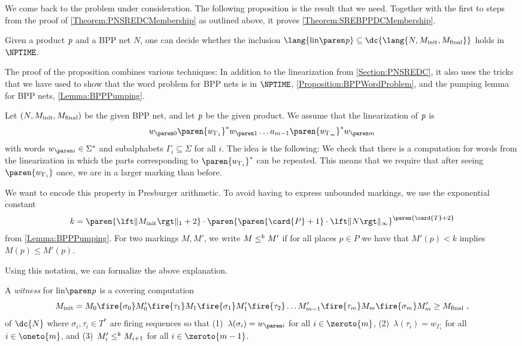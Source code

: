 \documentclass[../../diss.tex]{subfiles}
\begin{document}
We come back to the problem under consideration.
The following proposition is the result that we need.
Together with the first to steps from the proof of \cref{Theorem:PNSREDCMembership} as outlined above, it proves \cref{Theorem:SREBPPDCMembership}.

\begin{proposition}%
\label{Proposition:BPPLinearizationInclusion}%
    Given a product $\mathit{p}$ and a BPP net $N$, one can decide whether the inclusion
    $\lang{\linof{\product}} \subseteq \dc{\lang{N,\Minit,\Mfinal}}$
    holds in $\NPTIME$.
\end{proposition}

The proof of the proposition combines various techniques:
In addition to the linearization from \cref{Section:PNSREDC}, it also uses the tricks that we have used to show that the word problem for BPP nets is in $\NPTIME$, \cref{Proposition:BPPWordProblem}, and the pumping lemma for BPP nets, \cref{Lemma:BPPPumping}.

%
\cheatpagebreak
%

Let $(N,M_{\text{init}},M_{\text{final}})$ be the given BPP net, and let $\mathit{p}$ be the given product.
We assume that the linearization of $\mathit{p}$ is
\[
    \dtr{w}{0} \paren{w_{\Gamma_1}}^* \dtr{w}{1} \ldots a_{m-1} \paren{w_{\Gamma_m}}^* \dtr{w}{m}
\]
with words $\dtr{w}{i} \in \Sigma^*$ and subalphabets $\Gamma_i \subseteq \Sigma$ for all $i$.
The idea is the following:
We check that there is a computation for words from the linearization in which the parts corresponding to $\paren{w_{\Gamma_i}}^*$ can be repeated.
This means that we require that after seeing $\paren{w_{\Gamma_i}}$ once, we are in a larger marking than before.

We want to encode this property in Presburger arithmetic.
To avoid having to express unbounded markings, we use the exponential constant
\[
    k = \paren{\normone{\Minit}+2} \cdot \paren{ \paren{\card{P}+1} \cdot \norminf{N}}^{ \paren{\card{T} + 2} }
\]
from \cref{Lemma:BPPPumping}.
For two markings $M, M'$, we write $M \leq^k M'$ if for all places $p\in P$ we have that $M'(p) < k$ implies $M(p) \leq M'(p)$.

Using this notation, we can formalize the above explanation.

\begin{definition}%
\label{Definition:BPPWitness}%
    A \emph{witness} for $\linof{\product}$ is a covering computation
    \[
        \Minit
        =
        M_0 \fire{\sigma_0} M_0'
        \fire{\tau_1}
        M_1 \fire{\sigma_1} M_1'
        \fire{\tau_2}
        \ldots
        M_{m-1}'
        \fire{\tau_{m}}
        M_m \fire{\sigma_m} M_m'
        \geq \Mfinal
        \ ,
    \]
    of $\dc{N}$ where $\sigma_i, \tau_i \in T^*$ are firing sequences so that
    (1)~$\lambda(\sigma_i) = \dtr{w}{i}$ for all $i \in  \zeroto{m}$,
    (2)~$\lambda(\tau_i) = w_{\Gamma_i}$ for all $i \in \oneto{m}$, and
    (3)~$M_i'\leq^k M_{i+1}$ for all $i \in \zeroto{m-1}$.
\end{definition}
\end{document}
